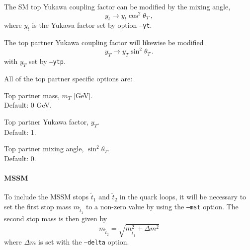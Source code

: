 \documentclass[12pt,a4wide]{article}
\begin{document}
The SM top Yukawa coupling factor can be modified by the mixing angle, 
\begin{equation}
   y_t \rightarrow y_t \cos^2\theta_T \,, 
\end{equation} 
where $y_t$ is the Yukawa factor set by option \texttt{--yt}. 

The top partner Yukawa coupling factor will likewise be modified 
\begin{equation}
   y_T \rightarrow y_T \sin^2\theta_T \,. 
\end{equation} 
with $y_T$ set by \texttt{--ytp}. 

All of the top partner specific options are: 
\begin{description}[labelindent=\parindent, labelwidth =\widthof{\bfseries9999999999999999999999}, leftmargin = !] 
	\item[\texttt{--mtp <value>}] Top partner mass, $m_{T}$ [GeV]. \\ Default: 0 GeV. 
	\item[\texttt{--ytp <value>}] Top partner Yukawa factor, $y_T$. \\ Default: 1. 
	\item[\texttt{--sth2 <value>}] Top partner mixing angle, $\sin^2 \theta_T$. \\ Default: 0. 
\end{description} 

\paragraph{MSSM}
To include the MSSM stops $\tilde{t}_1$ and $\tilde{t}_2$ in the quark loops, it will be necessary to set the first stop mass $m_{\tilde{t}_1}$ to a non-zero value by using the \texttt{--mst} option. The second stop mass is then given by 
\begin{equation}
	m_{\tilde{t}_2} = \sqrt{m_{\tilde{t}_1}^2 + \Delta m^2} 
\end{equation}
where $\Delta m$ is set with the \texttt{--delta} option. 
\end{document}

